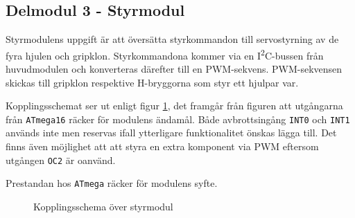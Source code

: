 \documentclass[11pt]{article}
\begin{document}
\begin{flushleft}
\pagebreak
\section{Delmodul 3 - Styrmodul}
Styrmodulens uppgift är att översätta styrkommandon till servostyrning av de fyra hjulen och gripklon. Styrkommandona kommer via en I\textsuperscript{2}C-bussen från huvudmodulen och konverteras därefter till en PWM-sekvens. PWM-sekvensen skickas till gripklon respektive H-bryggorna som styr ett hjulpar var. 

Kopplingsschemat ser ut enligt figur \ref{kopplingsschema:styrmodul}, det framgår från figuren att utgångarna från \verb+ATmega16+ räcker för modulens ändamål. Både avbrottsingång \verb+INT0+ och \verb+INT1+ används inte men reservas ifall ytterligare funktionalitet önskas lägga till. Det finns även möjlighet att att styra en extra komponent via PWM eftersom utgången \verb+OC2+ är oanvänd.  

Prestandan hos \verb+ATmega+ räcker för modulens syfte. 

\begin{figure}[htbp]
\centering
\noindent{}
	\caption{Kopplingsschema över styrmodul \label{kopplingsschema:styrmodul}}	
\end{figure}
 

\end{flushleft}
\end{document}
